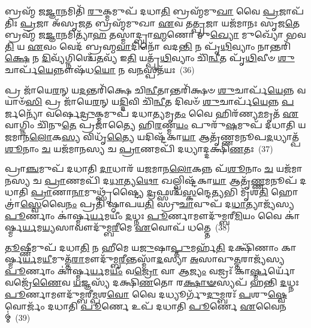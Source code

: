 {\anuvakamend[{𑌇𑌨𑍍𑌦𑍍𑌰𑌃᳴ \ul{𑌪}\-𑌶𑍁𑌕𑌾᳴𑌮𑌸𑍍𑌯 𑌭𑌵𑌤𑍍𑌯𑌵𑌿\-\ul{𑌶}\-𑌥𑍍𑌸𑌯𑍋᳴𑌨𑌿𑌂 𑌵𑌿𑍞\-\ul{𑌶}\-𑌤𑌿𑌶𑍍𑌚᳴}]}%

𑌬𑍍𑌰𑌹𑍍𑌮᳴ 𑌜\-\ul{𑌜𑍍𑌞𑌾}\-𑌨𑌮𑌿𑌤𑌿᳴ \ul{𑌰𑍁}\-𑌕𑍍𑌮𑌮𑍁𑌪᳴ 𑌦𑌧𑌾\-\ul{𑌤𑌿} 𑌬𑍍𑌰𑌹𑍍𑌮᳴𑌮𑍁\-\ul{𑌖𑌾} 𑌵𑍈 \ul{𑌪𑍍𑌰}\-𑌜𑌾𑌪᳴𑌤𑌿𑌃 \ul{𑌪𑍍𑌰}\-𑌜𑌾 𑌅᳴𑌸𑍃𑌜\-\ul{𑌤} 𑌬𑍍𑌰𑌹𑍍𑌮᳴𑌮𑍁𑌖𑌾 \ul{𑌏}\-𑌵 𑌤\-\ul{𑌤𑍍𑌪𑍍𑌰}\-𑌜𑌾 𑌯𑌜᳴𑌮𑌾𑌨𑌃 𑌸𑍃𑌜\-\ul{𑌤𑍇} 𑌬𑍍𑌰𑌹𑍍𑌮᳴ 𑌜\-\ul{𑌜𑍍𑌞𑌾}\-𑌨𑌮𑌿𑌤𑍍𑌯𑌾᳴\-\ul{𑌹} 𑌤𑌸𑍍𑌮𑌾॑𑌦𑍍𑌬𑍍𑌰𑌾\-\ul{𑌹𑍍𑌮}\-𑌣𑍋 𑌮𑍁\-\ul{𑌖𑍍𑌯𑍋} 𑌮𑍁𑌖𑍍𑌯𑍋᳴ 𑌭𑌵\-\ul{𑌤𑌿} 𑌯 \ul{𑌏}\-𑌵𑌂 𑌵𑍇𑌦᳴ 𑌬𑍍𑌰𑌹𑍍𑌮\-\ul{𑌵𑌾}\-𑌦𑌿𑌨𑍋᳴ 𑌵𑌦\-\ul{𑌨𑍍𑌤𑌿} 𑌨 𑌪𑍃᳴\-\ul{𑌥𑌿}\-𑌵𑍍𑌯𑌾𑌂 𑌨𑌾𑌨𑍍𑌤𑌰𑌿᳴\-\ul{𑌕𑍍𑌷𑍇} 𑌨 \ul{𑌦𑌿}\-𑌵𑍍𑌯᳴𑌗𑍍𑌨𑌿𑌶𑍍𑌚𑍇᳴\-\ul{𑌤}\-𑌵𑍍𑌯᳴ 𑌇\-\ul{𑌤𑌿} 𑌯𑌤𑍍𑌪𑍃᳴\-\ul{𑌥𑌿}\-𑌵𑍍𑌯𑌾𑌂 𑌚𑌿᳴\-\ul{𑌨𑍍𑌵𑍀}\-𑌤 𑌪𑍃᳴\-\ul{𑌥𑌿}\-𑌵𑍀𑍞 \ul{𑌶𑍁}\-𑌚𑌾𑌰𑍍𑌪᳴\-\ul{𑌯𑍇}\-𑌨𑍍𑌨𑍗𑌷᳴𑌧\-\ul{𑌯𑍋} 𑌨 𑌵\-\ul{𑌨}\-𑌸𑍍𑌪𑌤᳴𑌯𑌃~(36)

𑌪𑍍𑌰 𑌜𑌾᳴𑌯𑍇\-\ul{𑌰}\-𑌨𑍍 𑌯\-\ul{𑌦}\-𑌨𑍍𑌤𑌰𑌿᳴𑌕𑍍𑌷𑍇 𑌚𑌿\-\ul{𑌨𑍍𑌵𑍀}\-𑌤𑌾𑌨𑍍𑌤𑌰𑌿᳴𑌕𑍍𑌷𑍞 \ul{𑌶𑍁}\-𑌚𑌾𑌰𑍍𑌪᳴\-\ul{𑌯𑍇}\-𑌨𑍍𑌨 𑌵𑌯𑌾𑍞᳴\-\ul{𑌸𑌿} 𑌪𑍍𑌰 𑌜𑌾᳴𑌯𑍇\-\ul{𑌰}\-𑌨𑍍 𑌯\-\ul{𑌦𑍍𑌦𑌿}\-𑌵𑌿 𑌚𑌿᳴\-\ul{𑌨𑍍𑌵𑍀}\-𑌤 𑌦𑌿𑌵𑍞᳴ \ul{𑌶𑍁}\-𑌚𑌾𑌰𑍍𑌪᳴\-\ul{𑌯𑍇}\-𑌨𑍍𑌨 \ul{𑌪}\-𑌰𑍍𑌜𑌨𑍍𑌯𑍋᳴ 𑌵𑌰𑍍\mbox{}𑌷𑍇\-\ul{𑌦𑍍𑌰𑍁}\-𑌕𑍍𑌮𑌮𑍁𑌪᳴ 𑌦𑌧𑌾\-\ul{𑌤𑍍𑌯}\-𑌮𑍃\-\ul{𑌤𑌂} 𑌵𑍈 𑌹𑌿𑌰᳴𑌣𑍍𑌯\-\ul{𑌮}\-𑌮𑍃𑌤᳴ \ul{𑌏}\-𑌵𑌾𑌗𑍍𑌨𑌿𑌂 𑌚𑌿᳴𑌨𑍁\-\ul{𑌤𑍇} 𑌪𑍍𑌰𑌜𑌾॑𑌤𑍍𑌯𑍈 𑌹𑌿\-\ul{𑌰}\-𑌣𑍍𑌮\-\ul{𑌯𑌂} 𑌪𑍁𑌰𑍁᳴\-\ul{𑌷}\-𑌮𑍁𑌪᳴ 𑌦𑌧𑌾𑌤𑌿 𑌯𑌜𑌮𑌾𑌨\-\ul{𑌲𑍋}\-𑌕\-\ul{𑌸𑍍𑌯} 𑌵𑌿𑌧𑍃᳴\-\ul{𑌤𑍍𑌯𑍈} 𑌯𑌦𑌿𑌷𑍍𑌟᳴𑌕𑌾\-\ul{𑌯𑌾} 𑌆𑌤𑍃᳴𑌣𑍍𑌣𑌮𑌨𑍂𑌪\-\ul{𑌦}\-𑌧𑍍𑌯𑌾𑌤𑍍𑌪᳴\-\ul{𑌶𑍂}\-𑌨𑌾𑌂 \ul{𑌚} 𑌯𑌜᳴𑌮𑌾𑌨𑌸𑍍𑌯 𑌚 \ul{𑌪𑍍𑌰𑌾}\-𑌣𑌮𑌪𑌿᳴ 𑌦𑌧𑍍𑌯𑌾𑌦𑍍𑌦𑌕𑍍𑌷𑌿\-\ul{𑌣}\-𑌤𑌃~(37)

𑌪𑍍𑌰𑌾\-\ul{𑌞𑍍𑌚}\-𑌮𑍁𑌪᳴ 𑌦𑌧𑌾𑌤𑌿 \ul{𑌦𑌾}\-𑌧𑌾𑌰᳴ 𑌯𑌜𑌮𑌾𑌨\-\ul{𑌲𑍋}\-𑌕𑌨𑍍𑌨 𑌪᳴\-\ul{𑌶𑍂}\-𑌨𑌾𑌂 \ul{𑌚} 𑌯𑌜᳴𑌮𑌾𑌨𑌸𑍍𑌯 𑌚 \ul{𑌪𑍍𑌰𑌾}\-𑌣𑌮𑌪𑌿᳴ 𑌦\-\ul{𑌧𑌾}\-𑌤𑍍𑌯\-\ul{𑌥𑍋} 𑌖𑌲𑍍𑌵𑌿𑌷𑍍𑌟᳴𑌕𑌾\-\ul{𑌯𑌾} 𑌆𑌤𑍃᳴\-\ul{𑌣𑍍𑌣}\-𑌮𑌨𑍂𑌪᳴ 𑌦𑌧𑌾𑌤𑌿 \ul{𑌪𑍍𑌰𑌾}\-𑌣𑌾\-\ul{𑌨𑌾}\-𑌮𑍁𑌥𑍍𑌸𑍃᳴𑌷𑍍𑌟𑍍𑌯𑍈 \ul{𑌦𑍍𑌰}\-𑌫𑍍𑌸𑌶𑍍𑌚᳴\-\ul{𑌸𑍍𑌕}\-𑌨𑍍𑌦𑍇\-\ul{𑌤𑍍𑌯}\-𑌭𑌿 𑌮𑍃᳴𑌶\-\ul{𑌤𑌿} 𑌹𑍋𑌤𑍍𑌰𑌾॑\-\ul{𑌸𑍍𑌵𑍇}\-𑌵𑍈\-\ul{𑌨𑌂} 𑌪𑍍𑌰𑌤𑌿᳴ 𑌷𑍍𑌠𑌾𑌪𑌯\-\ul{𑌤𑌿} 𑌸𑍍𑌰𑍁\-\ul{𑌚𑌾}\-𑌵𑍁𑌪᳴ 𑌦\-\ul{𑌧𑌾}\-𑌤𑍍𑌯𑌾𑌜𑍍𑌯᳴𑌸𑍍𑌯 \ul{𑌪𑍂}\-𑌰𑍍𑌣𑌾𑌂 𑌕𑌾॑𑌰𑍍𑌷𑍍𑌮\-\ul{𑌰𑍍𑌯}\-𑌮𑌯𑍀𑌂॑ \ul{𑌦}\-𑌧𑍍𑌨𑌃 \ul{𑌪𑍂}\-𑌰𑍍𑌣𑌾𑌮𑍗𑌦𑍁᳴𑌮𑍍𑌬𑌰𑍀\-\ul{𑌮𑌿}\-𑌯𑌂 𑌵𑍈 𑌕𑌾॑𑌰𑍍𑌷𑍍𑌮\-\ul{𑌰𑍍𑌯}\-𑌮\-\ul{𑌯𑍍𑌯}\-𑌸𑌾𑌵𑍗𑌦𑍁᳴𑌮𑍍𑌬\-\ul{𑌰𑍀}\-𑌮𑍇 \ul{𑌏}\-𑌵𑍋𑌪᳴ 𑌧𑌤𑍍𑌤𑍇~(38)

\-\ul{𑌤𑍂}\-𑌷𑍍𑌣𑍀𑌮𑍁𑌪᳴ 𑌦𑌧𑌾\-\ul{𑌤𑌿} 𑌨 𑌹𑍀𑌮𑍇 𑌯\-\ul{𑌜𑍁}\-𑌷𑌾\-\ul{𑌪𑍍𑌤𑍁}\-𑌮𑌰𑍍\mbox{}𑌹᳴\-\ul{𑌤𑌿} 𑌦𑌕𑍍𑌷𑌿᳴𑌣𑌾𑌂 𑌕𑌾𑌰𑍍𑌷𑍍𑌮\-\ul{𑌰𑍍𑌯}\-𑌮\-\ul{𑌯𑍀}\-𑌮𑍁𑌤𑍍𑌤᳴\-\ul{𑌰𑌾}\-𑌮𑍗𑌦𑍁᳴𑌮𑍍𑌬\-\ul{𑌰𑍀}\-𑌨𑍍𑌤𑌸𑍍𑌮𑌾᳴\-\ul{𑌦}\-𑌸𑍍𑌯𑌾 \ul{𑌅}\-𑌸𑌾𑌵𑍁\-\ul{𑌤𑍍𑌤}\-𑌰𑌾𑌜𑍍𑌯᳴𑌸𑍍𑌯 \ul{𑌪𑍂}\-𑌰𑍍𑌣𑌾𑌂 𑌕𑌾॑𑌰𑍍𑌷𑍍𑌮\-\ul{𑌰𑍍𑌯}\-𑌮\-\ul{𑌯𑍀𑌂} 𑌵\-\ul{𑌜𑍍𑌰𑍋} 𑌵𑌾 𑌆\-\ul{𑌜𑍍𑌯𑌂} 𑌵𑌜𑍍𑌰𑌃᳴ 𑌕𑌾\-\ul{𑌰𑍍𑌷𑍍𑌮}\-𑌰𑍍𑌯𑍋᳴ 𑌵𑌜𑍍𑌰𑍇᳴\-\ul{𑌣𑍈}\-𑌵 \ul{𑌯}\-𑌜𑍍𑌞𑌸𑍍𑌯᳴ 𑌦𑌕𑍍𑌷𑌿\-\ul{𑌣}\-𑌤𑍋 𑌰\-\ul{𑌕𑍍𑌷𑌾}\-\-\ul{𑍟}\-𑌸𑍍𑌯𑌪᳴ 𑌹𑌨𑍍𑌤𑌿 \ul{𑌦}\-𑌧𑍍𑌨𑌃 \ul{𑌪𑍂}\-𑌰𑍍𑌣𑌾𑌮𑍗𑌦𑍁᳴𑌮𑍍𑌬𑌰𑍀\-\ul{𑌮𑍍𑌪}\-𑌶\-\ul{𑌵𑍋} 𑌵𑍈 𑌦𑌧𑍍𑌯𑍂𑌰𑍍𑌗𑍁᳴\-\ul{𑌦𑍁}\-𑌮𑍍𑌬𑌰𑌃᳴ \ul{𑌪}\-𑌶𑍁\-\ul{𑌷𑍍𑌵𑍇}\-𑌵𑍋𑌰𑍍𑌜𑌂᳴ 𑌦𑌧𑌾𑌤𑌿 \ul{𑌪𑍂}\-𑌰𑍍𑌣𑍇 𑌉𑌪᳴ 𑌦𑌧𑌾𑌤𑌿 \ul{𑌪𑍂}\-𑌰𑍍𑌣𑍇 \ul{𑌏}\-𑌵𑍈𑌨𑌮𑍍॑~(39)


